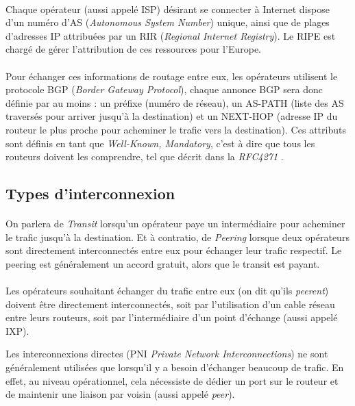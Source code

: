 \paragraph{}
Chaque opérateur (aussi appelé ISP) désirant se connecter à Internet dispose d'un numéro d'AS (\emph{Autonomous System Number}) unique, ainsi que de plages d'adresses IP attribuées par un RIR (\emph{Regional Internet Registry}). Le RIPE est chargé de gérer l'attribution de ces ressources pour l'Europe.

\paragraph{}
Pour échanger ces informations de routage entre eux, les opérateurs utilisent le protocole BGP (\emph{Border Gateway Protocol}), chaque annonce BGP sera donc définie par au moins : un préfixe (numéro de réseau), un AS-PATH (liste des AS traversés pour arriver jusqu'à la destination) et un NEXT-HOP (adresse IP du routeur le plus proche pour acheminer le trafic vers la destination). Ces attributs sont définis en tant que \emph{Well-Known, Mandatory}, c'est à dire que tous les routeurs doivent les comprendre, tel que décrit dans la \emph{RFC4271} \cite{fenioux:BGP4}.

\subsection{Types d'interconnexion}

\paragraph{}
On parlera de \emph{Transit} lorsqu'un opérateur paye un intermédiaire pour acheminer le trafic jusqu'à la destination.
Et à contratio, de \emph{Peering} lorsque deux opérateurs sont directement interconnectés entre eux pour échanger leur trafic respectif. Le peering est généralement un accord gratuit, alors que le transit est payant.

\paragraph{}
Les opérateurs souhaitant échanger du trafic entre eux (on dit qu'ils \emph{peerent}) doivent être directement interconnectés, soit par l'utilisation d'un cable réseau entre leurs routeurs, soit par l'intermédiaire d'un point d'échange (aussi appelé IXP).

Les interconnexions directes (PNI \emph{Private Network Interconnections}) ne sont généralement utilisées que lorsqu'il y a besoin d'échanger beaucoup de trafic. En effet, au niveau opérationnel, cela nécessiste de dédier un port sur le routeur et de maintenir une liaison par voisin (aussi appelé \emph{peer}).

